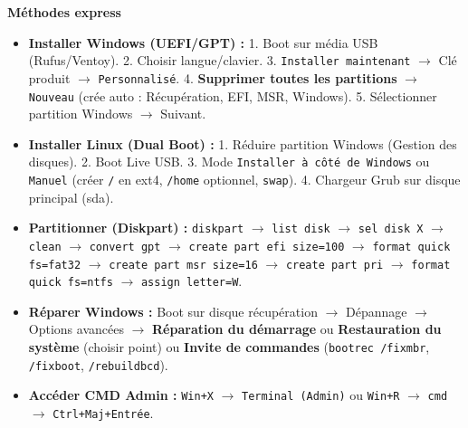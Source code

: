 \documentclass[11pt]{article}
\begin{document}
\begin{bilan}
\textbf{Méthodes express}\par
\begin{itemize}
    \item \textbf{Installer Windows (UEFI/GPT) :} 1. Boot sur média USB (Rufus/Ventoy). 2. Choisir langue/clavier. 3. \texttt{Installer maintenant} $\rightarrow$ Clé produit $\rightarrow$ \texttt{Personnalisé}. 4. \textbf{Supprimer toutes les partitions} $\rightarrow$ \texttt{Nouveau} (crée auto : Récupération, EFI, MSR, Windows). 5. Sélectionner partition Windows $\rightarrow$ Suivant.
    \item \textbf{Installer Linux (Dual Boot) :} 1. Réduire partition Windows (Gestion des disques). 2. Boot Live USB. 3. Mode \texttt{Installer à côté de Windows} ou \texttt{Manuel} (créer \texttt{/} en ext4, \texttt{/home} optionnel, \texttt{swap}). 4. Chargeur Grub sur disque principal (sda).
    \item \textbf{Partitionner (Diskpart) :} \texttt{diskpart} $\rightarrow$ \texttt{list disk} $\rightarrow$ \texttt{sel disk X} $\rightarrow$ \texttt{clean} $\rightarrow$ \texttt{convert gpt} $\rightarrow$ \texttt{create part efi size=100} $\rightarrow$ \texttt{format quick fs=fat32} $\rightarrow$ \texttt{create part msr size=16} $\rightarrow$ \texttt{create part pri} $\rightarrow$ \texttt{format quick fs=ntfs} $\rightarrow$ \texttt{assign letter=W}.
    \item \textbf{Réparer Windows :} Boot sur disque récupération $\rightarrow$ Dépannage $\rightarrow$ Options avancées $\rightarrow$ \textbf{Réparation du démarrage} ou \textbf{Restauration du système} (choisir point) ou \textbf{Invite de commandes} (\texttt{bootrec /fixmbr}, \texttt{/fixboot}, \texttt{/rebuildbcd}).
    \item \textbf{Accéder CMD Admin :} \texttt{Win+X} $\rightarrow$ \texttt{Terminal (Admin)} ou \texttt{Win+R} $\rightarrow$ \texttt{cmd} $\rightarrow$ \texttt{Ctrl+Maj+Entrée}.
\end{itemize}


\end{bilan}
\end{document}
